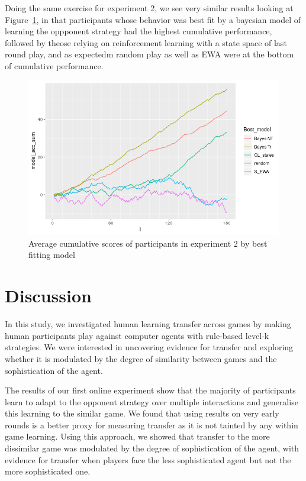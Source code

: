 \documentclass[man,floatsintext]{apa6}
\begin{document}
Doing the same exercise for experiment 2, we see very similar results looking at Figure~\ref{fig:exp2-cumScores}, in that participants whose behavior was best fit by a bayesian model of learning the oppponent strategy had the highest cumulative performance, followed by theose relying on reinforcement learning with a state space of last round play, and as expectedm random play as well as EWA were at the bottom of cumulative performance.

\begin{figure}

{\centering \includegraphics{../Report/images/exp2_cumScores} 

}

\caption{Average cumulative scores of participants in experiment 2 by best fitting model}\label{fig:exp2-cumScores}
\end{figure}

\newpage

\hypertarget{discussion}{%
\section{Discussion}\label{discussion}}

In this study, we investigated human learning transfer across games by making human participants play against computer agents with rule-based level-k strategies. We were interested in uncovering evidence for transfer and exploring whether it is modulated by the degree of similarity between games and the sophistication of the agent.

The results of our first online experiment show that the majority of participants learn to adapt to the opponent strategy over multiple interactions and generalise this learning to the similar game. We found that using results on very early rounds is a better proxy for measuring transfer as it is not tainted by any within game learning. Using this approach, we showed that transfer to the more dissimilar game was modulated by the degree of sophistication of the agent, with evidence for transfer when players face the less sophisticated agent but not the more sophisticated one.
\end{document}
